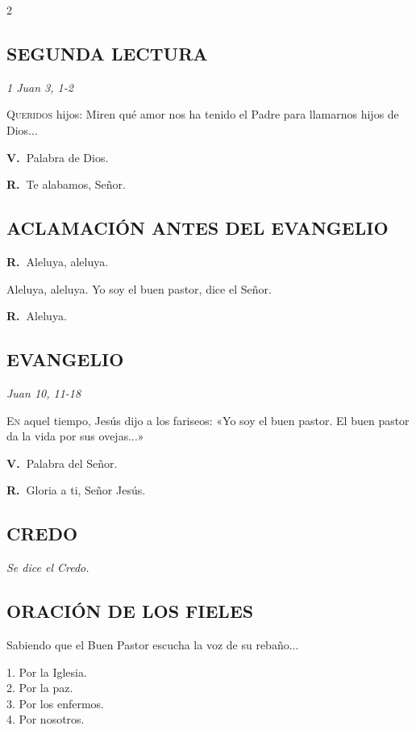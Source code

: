 \documentclass[11pt, letterpaper, twoside]{article}
\newcommand{\rubrica}[1]{\textcolor{rubricred}{\small\textit{#1}}}
\newcommand{\vers}{\textcolor{rubricred}{\textbf{V.\ }}}
\newcommand{\resp}{\textcolor{rubricred}{\textbf{R.\ }}}
\begin{document}
\begin{multicols}{2}
\subsection*{SEGUNDA LECTURA}
\noindent\rubrica{1 Juan 3, 1-2} \par\vspace{0.2cm}
\lettrine{Q}{ueridos} hijos: Miren qué amor nos ha tenido el Padre para llamarnos hijos de Dios... \par\vspace{0.2cm}
\vers Palabra de Dios. \par
\resp Te alabamos, Señor.


\subsection*{ACLAMACIÓN ANTES DEL EVANGELIO}
\resp Aleluya, aleluya. \par
Aleluya, aleluya. Yo soy el buen pastor, dice el Señor. \par
\resp Aleluya. \par\vspace{0.3cm}

\subsection*{EVANGELIO}
\noindent\rubrica{Juan 10, 11-18} \par\vspace{0.2cm}
\lettrine{E}{n} aquel tiempo, Jesús dijo a los fariseos: «Yo soy el buen pastor. El buen pastor da la vida por sus ovejas...» \par\vspace{0.2cm}
\vers Palabra del Señor. \par
\resp Gloria a ti, Señor Jesús.


\subsection*{CREDO}
\noindent\rubrica{Se dice el Credo.} \par\vspace{0.3cm}

\subsection*{ORACIÓN DE LOS FIELES}
Sabiendo que el Buen Pastor escucha la voz de su rebaño...

1. Por la Iglesia. \\ 
2. Por la paz. \\ 
3. Por los enfermos. \\ 
4. Por nosotros. \par\vspace{0.3cm}







\end{multicols}
\end{document}
